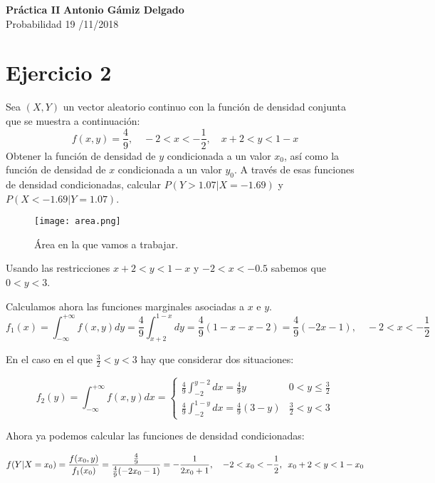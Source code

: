\documentclass[a4paper, 11pt]{article}
\begin{document}
\noindent
\large\textbf{Práctica II} \hfill \textbf{Antonio Gámiz Delgado} \\
\normalsize Probabilidad \hfill 19 /11/2018

\section*{Ejercicio 2}
Sea $(X,Y)$ un vector aleatorio continuo con la función de densidad conjunta que se muestra a continuación:
\[
f(x,y)=\frac{4}{9}, \quad -2<x<-\frac{1}{2}, \quad x+2<y<1-x
\]
Obtener la función de densidad de $y$ condicionada a un valor $x_0$, así como la función de densidad de $x$ condicionada a un valor $y_0$. A través de esas funciones de densidad condicionadas, calcular $P(Y>1.07|X=-1.69)$ y $P(X<-1.69|Y=1.07)$. \\[0.1cm]

\begin{figure}[h]
\center
\texttt{[image: area.png]}
\caption{Área en la que vamos a trabajar.}
\end{figure}

Usando las restricciones $x+2<y<1-x$ y $-2<x<-0.5$ sabemos que $0<y<3$.

Calculamos ahora las funciones marginales asociadas a $x$ e $y$.
\[
f_1(x)=\int_{-\infty}^{+\infty}f(x,y)dy=\frac{4}{9}\int_{x+2}^{1-x}dy=\frac{4}{9}\left(1-x-x-2\right)=\frac{4}{9}\left(-2x-1\right), \quad -2<x<-\frac{1}{2}
\]

En el caso en el que $\frac{3}{2} < y < 3$ hay que considerar dos situaciones:

\[
f_2(y)=\int_{-\infty}^{+\infty}f(x,y)dx=\left \{ \begin{array}{ll}
\displaystyle\frac{4}{9}\int_{-2}^{y-2}dx=\frac{4}{9}y & 0<y\leq\frac{3}{2}\\
\displaystyle\frac{4}{9} \int_{-2}^{1-y}dx=\frac{4}{9}(3-y) & \frac{3}{2} < y < 3
\end{array}\right.
\]

Ahora ya podemos calcular las funciones de densidad condicionadas:

\[
f(Y|X=x_0)=\displaystyle\frac{f(x_0,y)}{f_1(x_0)}=\frac{\frac{4}{9}}{\frac{4}{9}(-2x_0-1)}=-\frac{1}{2x_0+1}, \quad -2<x_0<-\frac{1}{2}, \enskip x_0+2 < y < 1-x_0
\]
\end{document}
